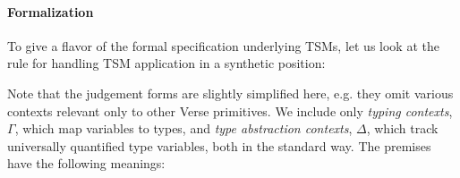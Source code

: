 \paragraph{Formalization} To give a flavor of the formal specification underlying TSMs, let us look at the rule for handling TSM application in a synthetic position: 
\begin{mathpar}
\end{mathpar}
Note that the judgement forms are  slightly simplified here, e.g. they omit various contexts relevant only to other Verse primitives. We include only \emph{typing contexts}, $\Gamma$, which map variables to types, and \emph{type abstraction contexts}, $\Delta$, which track universally quantified type variables, both in the standard way. The premises have the following meanings:
